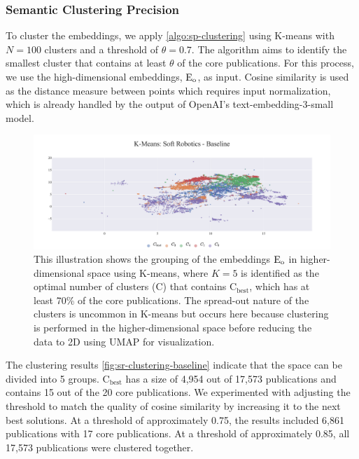 \subsubsection{Semantic Clustering Precision}

To cluster the embeddings, we apply \autoref{algo:sp-clustering} using K-means with \( N = 100 \) clusters and a threshold of \( \theta = 0.7 \). The algorithm aims to identify the smallest cluster that contains at least $\theta$ of the core publications. For this process, we use the high-dimensional embeddings, $\mathop{}\!\mathrm{E_{o}}$, as input. Cosine similarity is used as the distance measure between points which requires input normalization, which is already handled by the output of OpenAI's text-embedding-3-small model.

\begin{figure}[!h]
	\hspace*{-1cm}	
	\includegraphics[scale=0.45]{pics/sr-clustering-baseline.pdf}
	\caption[Semantic Clustering: Soft Robotics]{This illustration shows the grouping of the embeddings $\mathop{}\!\mathrm{E_{o}}$ in higher-dimensional space using K-means, where $K=5$ is identified as the optimal number of clusters (C) that contains $\text{C}_{\text{best}}$, which has at least 70\% of the core publications. The spread-out nature of the clusters is uncommon in K-means but occurs here because clustering is performed in the higher-dimensional space before reducing the data to 2D using UMAP for visualization.}\label{fig:sr-clustering-baseline}
\end{figure}

The clustering results \autoref{fig:sr-clustering-baseline} indicate that the space can be divided into 5 groups. $\text{C}_{\text{best}}$ has a size of 4,954 out of 17,573 publications and contains 15 out of the 20 core publications. We experimented with adjusting the threshold to match the quality of cosine similarity by increasing it to the next best solutions. At a threshold of approximately 0.75, the results included 6,861 publications with 17 core publications. At a threshold of approximately 0.85, all 17,573 publications were clustered together.


